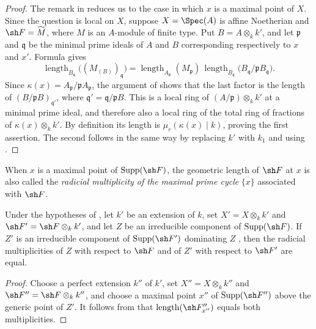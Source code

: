 \begin{proof}
The remark in  reduces us to the case in which $x$ is
a maximal point of $X$.
Since the question is local on $X$, suppose
$X=\Spec(A)$ is affine Noetherian and $\sh F=\widetilde M$, where
$M$ is an $A$-module of finite type.
Put $B=A\otimes_k k'$, and let $\mathfrak p$ and $\mathfrak q$ be the
minimal prime ideals of $A$ and $B$ corresponding respectively to
$x$ and $x'$.
Formula  gives
\[
\operatorname{length}_{B_{\mathfrak q}}
 \bigl((M_{(B)})_{\mathfrak q}\bigr)
=
\operatorname{length}_{A_{\mathfrak p}}(M_{\mathfrak p})\,
\operatorname{length}_{B_{\mathfrak q}}
 \bigl(B_{\mathfrak q}/\mathfrak pB_{\mathfrak q}\bigr).
\]
Since
$\kappa(x)=A_{\mathfrak p}/\mathfrak pA_{\mathfrak p}$, the argument
of  shows that the last factor is the length of
$(B/\mathfrak pB)_{\mathfrak q'}$, where
$\mathfrak q'=\mathfrak q/\mathfrak pB$.
This is a local ring of
$(A/\mathfrak p)\otimes_k k'$ at a minimal prime ideal, and therefore
also a local ring of the total ring of fractions of
$\kappa(x)\otimes_k k'$.
By definition its length is $\mu_r(\kappa(x)\mid k)$, proving the
first assertion.
The second follows in the same way by replacing $k'$ with $k_1$ and
using .
\end{proof}

When $x$ is a maximal point of $\operatorname{Supp}(\sh F)$, the
geometric length of $\sh F$ at $x$ is also called the
\emph{radicial multiplicity of the maximal prime cycle}
$\overline{\{x\}}$ associated with $\sh F$.

\begin{corollary}[4.7.9]
\label{IV.4.7.9}
Under the hypotheses of , let $k'$ be an extension of
$k$, set $X'=X\otimes_k k'$ and $\sh F'=\sh F\otimes_k k'$, and let
$Z$ be an irreducible component of $\operatorname{Supp}(\sh F)$.
If $Z'$ is an irreducible component of
$\operatorname{Supp}(\sh F')$ dominating $Z$
, then the radicial multiplicities of $Z$ with respect
to $\sh F$ and of $Z'$ with respect to $\sh F'$ are equal.
\end{corollary}


\begin{proof}
Choose a perfect extension $k''$ of $k'$, set
$X''=X\otimes_k k''$ and $\sh F''=\sh F\otimes_k k''$, and choose a
maximal point $x''$ of $\operatorname{Supp}(\sh F'')$ above the
generic point of $Z'$.
It follows from  that
$\operatorname{length}(\sh F''_{x''})$ equals both multiplicities.
\end{proof}

